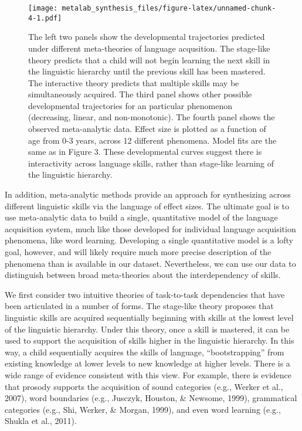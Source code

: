 \documentclass[english,floatsintext,man]{apa6}
\begin{document}
\begin{figure}[htbp]
\centering
\texttt{[image: metalab\_synthesis\_files/figure-latex/unnamed-chunk-4-1.pdf]}
\caption{The left two panels show the developmental trajectories
predicted under different meta-theories of language acqusition. The
stage-like theory predicts that a child will not begin learning the next
skill in the linguistic hierarchy until the previous skill has been
mastered. The interactive theory predicts that multiple skills may be
simultaneously acquired. The third panel shows other possible
developmental trajectories for an particular phenomenon (decreasing,
linear, and non-monotonic). The fourth panel shows the observed
meta-analytic data. Effect size is plotted as a function of age from 0-3
years, across 12 different phenomena. Model fits are the same as in
Figure 3. These developmental curves suggest there is interactivity
across language skills, rather than stage-like learning of the
linguistic hierarchy.}
\end{figure}

In addition, meta-analytic methods provide an approach for synthesizing
across different linguistic skills via the language of effect sizes. The
ultimate goal is to use meta-analytic data to build a single,
quantitative model of the language acquisition system, much like those
developed for individual language acquisition phenomena, like word
learning. Developing a single quantitative model is a lofty goal,
however, and will likely require much more precise description of the
phenomena than is available in our dataset. Nevertheless, we can use our
data to distinguish between broad meta-theories about the
interdependency of skills.

We first consider two intuitive theories of task-to-task dependencies
that have been articulated in a number of forms. The stage-like theory
proposes that linguistic skills are acquired sequentially beginning with
skills at the lowest level of the linguistic hierarchy. Under this
theory, once a skill is mastered, it can be used to support the
acquisition of skills higher in the linguistic hierarchy. In this way, a
child sequentially acquires the skills of language,
\enquote{bootstrapping} from existing knowledge at lower levels to new
knowledge at higher levels. There is a wide range of evidence consistent
with this view. For example, there is evidence that prosody supports the
acquisition of sound categories (e.g., Werker et al., 2007), word
boundaries (e.g., Jusczyk, Houston, \& Newsome, 1999), grammatical
categories (e.g., Shi, Werker, \& Morgan, 1999), and even word learning
(e.g., Shukla et al., 2011).
\end{document}
